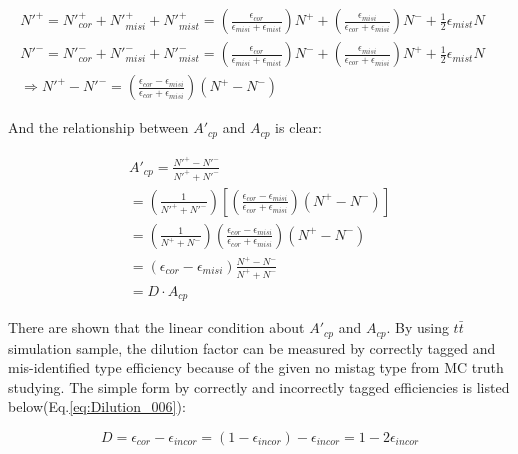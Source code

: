 		\begin{equation}
		\begin{split}
		N'^+ = N'^+_{cor} + N'^+_{misi} + N'^+_{mist} = (\frac{\epsilon_{cor}}{\epsilon_{misi} + \epsilon_{mist}})N^+ + (\frac{\epsilon_{misi}}{\epsilon_{cor} + \epsilon_{misi}})N^- + \frac{1}{2}\epsilon_{mist} N \\
		N'^- = N'^-_{cor} + N'^-_{misi} + N'^-_{mist} = (\frac{\epsilon_{cor}}{\epsilon_{misi} + \epsilon_{mist}})N^- + (\frac{\epsilon_{misi}}{\epsilon_{cor} + \epsilon_{misi}})N^+ + \frac{1}{2}\epsilon_{mist} N  \\
		\Rightarrow N'^+ - N'^- = (\frac{\epsilon_{cor}-\epsilon_{misi}}{\epsilon_{cor}+\epsilon_{misi}})(N^+ - N^-) \;\;\;\;\;\;\;\;\;\;\;\;\;\;\;\;\;\;\;\;\;\;\;\;\;\;\;\;\;\;\;\;\;\;\;\;\;\;\;\;\;\;\;\;\;\;\;\;\;\;\;\;\;\;\;\;\;
		\end{split}
		\label{eq:Dilution_004}
		\end{equation}
		\FloatBarrier

		And the relationship between $A'_{cp}$ and $A_{cp}$ is clear:

		\begin{equation}
		\begin{split}
		A'_{cp} = \frac{N'^+ - N'^-}{N'^+ + N'^-} \\
		= (\frac{1}{N'^+ + N'^-})[(\frac{\epsilon_{cor}-\epsilon_{misi}}{\epsilon_{cor}+\epsilon_{misi}})(N^+ - N^-)] \\
		= (\frac{1}{N^+ + N^-})(\frac{\epsilon_{cor}-\epsilon_{misi}}{\epsilon_{cor}+\epsilon_{misi}})(N^+ - N^-)\\
		= (\epsilon_{cor}-\epsilon_{misi})\frac{N^+ - N^-}{N^+ + N^-}\\
		= D \cdot A_{cp}
		\end{split}
		\label{eq:Dilution_005}
		\end{equation}
		\FloatBarrier

		There are shown that the linear condition about $A'_{cp}$ and $A_{cp}$. By using $t\bar{t}$ simulation sample, the dilution factor can be measured by correctly tagged and mis-identified type efficiency because of the given no mistag type from MC truth studying. The simple form by correctly and incorrectly tagged efficiencies is listed below(Eq.\ref{eq:Dilution_006}):

		\begin{equation}
		D = \epsilon_{cor} - \epsilon_{incor} = (1-\epsilon_{incor}) - \epsilon_{incor} = 1 - 2\epsilon_{incor}
		\label{eq:Dilution_006}
		\end{equation}
		\FloatBarrier

